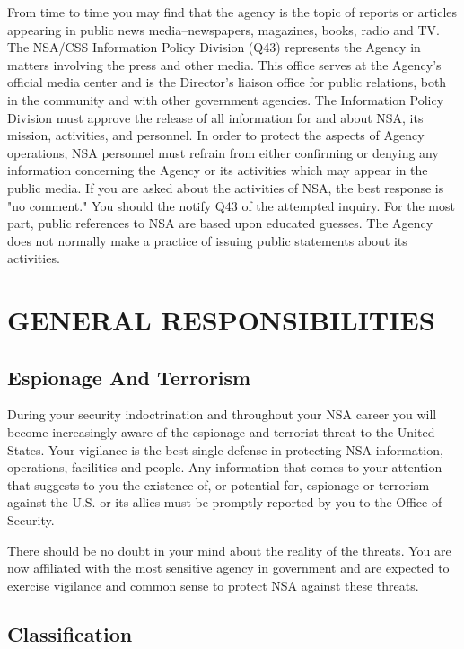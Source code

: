 \documentclass[a4]{article}
\begin{document}
From time to time you may find that the agency is the topic of reports or
articles appearing in public news media--newspapers, magazines, books, radio
and TV.  The NSA/CSS Information Policy Division (Q43) represents the Agency in
matters involving the press and other media.  This office serves at the
Agency's official media center and is the Director's liaison office for public
relations, both in the community and with other government agencies.  The
Information Policy Division must approve the release of all information for and
about NSA, its mission, activities, and personnel.  In order to protect the
aspects of Agency operations, NSA personnel must refrain from either confirming
or denying any information concerning the Agency or its activities which may
appear in the public media.  If you are asked about the activities of NSA, the
best response is "no comment."  You should the notify Q43 of the attempted
inquiry.  For the most part, public references to NSA are based upon educated
guesses.  The Agency does not normally make a practice of issuing public
statements about its activities.

\section{GENERAL RESPONSIBILITIES}

\subsection{Espionage And Terrorism}

During your security indoctrination and throughout your NSA career you will
become increasingly aware of the espionage and terrorist threat to the United
States.  Your vigilance is the best single defense in protecting NSA
information, operations, facilities and people.  Any information that comes to
your attention that suggests to you the existence of, or potential for,
espionage or terrorism against the U.S. or its allies must be promptly reported
by you to the Office of Security.

There should be no doubt in your mind about the reality of the threats.  You
are now affiliated with the most sensitive agency in government and are
expected to exercise vigilance and common sense to protect NSA against these
threats.

\subsection{Classification}
\end{document}
